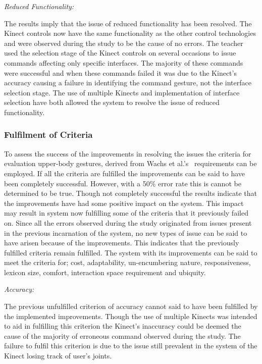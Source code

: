 \documentclass[link]{IWCOMP}
\begin{document}
\emph{Reduced Functionality:}
 
The results imply that the issue of reduced functionality has been resolved.
The Kinect controls now have the same functionality as the other control technologies and were observed during the study to be the cause of no errors.
The teacher used the selection stage of the Kinect controls on several occasions to issue commands affecting only specific interfaces.
The majority of these commands were successful and when these commands failed it was due to the Kinect's accuracy causing a failure in identifying the command gesture, not the interface selection stage.
The use of multiple Kinects and implementation of interface selection have both allowed the system to resolve the issue of reduced functionality.

\subsubsection{Fulfilment of Criteria}
\label{subsubsec:studyPhase2ObservationsFulfilment}

To assess the success of the improvements in resolving the issues the criteria for evaluation upper-body gestures, derived from Wachs et al.'s~\cite{Wachs2011} requirements can be employed.
If all the criteria are fulfilled the improvements can be said to have been completely successful.
However, with a 50\% error rate this is cannot be determined to be true.
Though not completely successful the results indicate that the improvements have had some positive impact on the system.
This impact may result in system now fulfilling some of the criteria that it previously failed on.
Since all the errors observed during the study originated from issues present in the previous incarnation of the system, no new types of issue can be said to have arisen because of the improvements.
This indicates that the previously fulfilled criteria remain fulfilled.
The system with its improvements can be said to meet the criteria for; cost, adaptability, un-encumbering nature, responsiveness, lexicon size, comfort, interaction space requirement and ubiquity.

\emph{Accuracy:}

The previous unfulfilled criterion of accuracy cannot said to have been fulfilled by the implemented improvements.
Though the use of multiple Kinects was intended to aid in fulfilling this criterion the Kinect's inaccuracy could be deemed the cause of the majority of erroneous command observed during the study.
The failure to fulfil this criterion is due to the issue still prevalent in the system of the Kinect losing track of user's joints.
\end{document}
